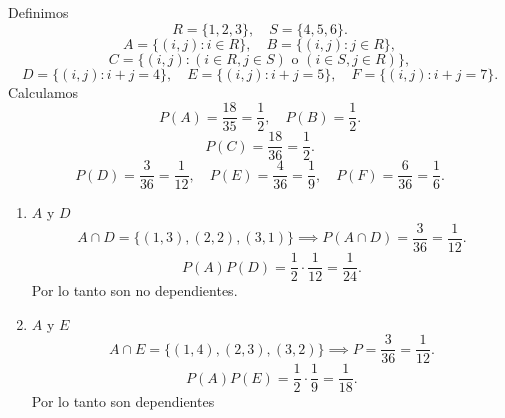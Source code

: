 \documentclass[12pt,a4paper]{article}
\begin{document}
    \begin{solucion}
        Definimos
        \begin{equation*}
            R=\{1,2,3\},\quad S=\{4,5,6\}.
        \end{equation*}
        \begin{equation*}
            A=\{(i,j):i\in R\},\quad B=\{(i,j):j\in R\},
        \end{equation*}
        \begin{equation*}
            C=\{(i,j):(i\in R,j\in S)\text{ o }(i\in S,j\in R)\},
        \end{equation*}
        \begin{equation*}
            D=\{(i,j):i+j=4\},\quad E=\{(i,j):i+j=5\},\quad F=\{(i,j):i+j=7\}.
        \end{equation*}
        Calculamos
        \begin{equation*}
            P(A)=\frac{18}{35}=\frac{1}{2},\quad P(B)=\frac{1}{2}.
        \end{equation*}
        \begin{equation*}
            P(C)=\frac{18}{36}=\frac{1}{2}.
        \end{equation*}
        \begin{equation*}
            P(D)=\frac{3}{36}=\frac{1}{12},\quad P(E)=\frac{4}{36}=\frac{1}{9},\quad P(F)=\frac{6}{36}=\frac{1}{6}.
        \end{equation*}
        \begin{enumerate}
            \item $A$ y $D$
            \begin{equation*}
                A\cap D=\{(1,3),(2,2),(3,1)\}\implies P(A\cap D)=\frac{3}{36}=\frac{1}{12}.
            \end{equation*}
            \begin{equation*}
                P(A)P(D)=\frac{1}{2}\cdot\frac{1}{12}=\frac{1}{24}.
            \end{equation*}
            Por lo tanto son no dependientes.
            \item $A$ y $E$
            \begin{equation*}
                A\cap E=\{(1,4),(2,3),(3,2)\}\implies P=\frac{3}{36}=\frac{1}{12}.
            \end{equation*}
            \begin{equation*}
                P(A)P(E)=\frac{1}{2}\cdot\frac{1}{9}=\frac{1}{18}.
            \end{equation*}
            Por lo tanto son dependientes
        \end{enumerate}
    \end{solucion}
\end{document}
